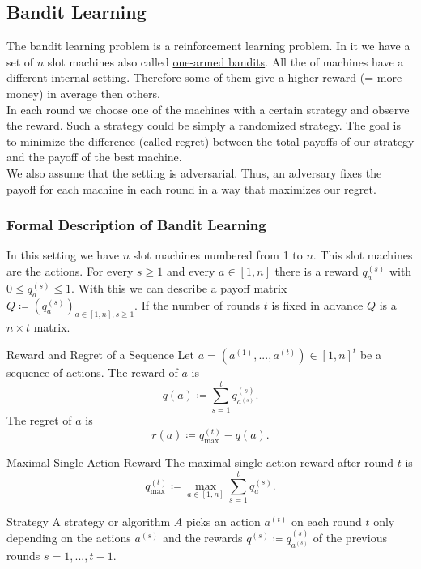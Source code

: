 \documentclass[english]{panikzettel}
\begin{document}
\subsection{Bandit Learning}
The bandit learning problem is a reinforcement learning problem. In it we have a set of $n$ slot machines also called \href{https://en.wikipedia.org/wiki/Slot_machine}{one-armed bandits}. All the of machines have a different internal setting. Therefore some of them give a higher reward (= more money) in average then others.\\
In each round we choose one of the machines with a certain strategy and observe the reward. Such a strategy could be simply a randomized strategy. The goal is to minimize the difference (called regret) between the total payoffs of our strategy and the payoff of the best machine.\\
We also assume that the setting is adversarial. Thus, an adversary fixes the payoff for each machine in each round in a way that maximizes our regret.

\subsubsection{Formal Description of Bandit Learning}
In this setting we have $n$ slot machines numbered from 1 to $n$. This slot machines are the actions. For every $s\geq 1$ and every $a\in [1,n]$ there is a reward $q_a^{(s)}$ with $0\leq q_a^{(s)} \leq 1$.
With this we can describe a payoff matrix $Q\coloneqq (q_a^{(s)})_{a\in[1,n], s\geq 1}$. If the number of rounds $t$ is fixed in advance $Q$ is a $n\times t$ matrix.

\begin{halfboxl}
\vspace{-\baselineskip}
\begin{defi}{Reward and Regret of a Sequence}
Let $a=(a^{(1)},...,a^{(t)})\in [1,n]^t$ be a sequence of actions. The reward of $a$ is
\[
q(a)\coloneqq \sum_{s=1}^t q_{a^{(s)}}^{(s)}.
\]
The regret of $a$ is
\[
r(a)\coloneqq q_{\max}^{(t)} -q(a).
\]
\end{defi}
\end{halfboxl}
\begin{halfboxr}
\vspace{-\baselineskip}
\begin{defi}{Maximal Single-Action Reward}
The maximal single-action reward after round $t$ is
\[
q_{\max}^{(t)}\coloneqq \max_{a\in[1,n]} \sum_{s=1}^t q_{a}^{(s)}.
\]
\end{defi}
\begin{defi}{Strategy}
A strategy or algorithm $A$ picks an action $a^{(t)}$ on each round $t$ only depending on the actions $a^{(s)}$ and the rewards $q^{(s)}\coloneqq q_{a^{(s)}}^{(s)}$ of the previous rounds $s=1,...,t-1$.
\end{defi}
\end{halfboxr}
\end{document}
